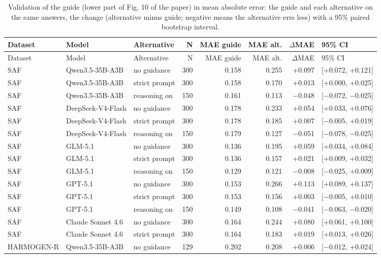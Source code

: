 \documentclass[10pt]{article}
\begin{document}
\begingroup\footnotesize
\begin{longtable}{lllrrrrl}
\caption{Validation of the guide (lower part of Fig. 10 of the paper) in mean absolute error: the guide and each alternative on the same answers, the change (alternative minus guide; negative means the alternative errs less) with a 95\% paired bootstrap interval.}\\
\hline
Dataset & Model & Alternative & N & MAE guide & MAE alt. & $\Delta$MAE & 95\% CI \\ \hline
\endfirsthead
\hline
Dataset & Model & Alternative & N & MAE guide & MAE alt. & $\Delta$MAE & 95\% CI \\ \hline
\endhead
SAF & Qwen3.5-35B-A3B & no guidance & 300 & 0.158 & 0.255 & +0.097 & [+0.072, +0.121] \\
SAF & Qwen3.5-35B-A3B & strict prompt & 300 & 0.158 & 0.170 & +0.013 & [+0.000, +0.025] \\
SAF & Qwen3.5-35B-A3B & reasoning on & 150 & 0.161 & 0.113 & $-$0.048 & [$-$0.072, $-$0.025] \\
SAF & DeepSeek-V4-Flash & no guidance & 300 & 0.178 & 0.233 & +0.054 & [+0.033, +0.076] \\
SAF & DeepSeek-V4-Flash & strict prompt & 300 & 0.178 & 0.185 & +0.007 & [$-$0.005, +0.019] \\
SAF & DeepSeek-V4-Flash & reasoning on & 150 & 0.179 & 0.127 & $-$0.051 & [$-$0.078, $-$0.025] \\
SAF & GLM-5.1 & no guidance & 300 & 0.136 & 0.195 & +0.059 & [+0.034, +0.084] \\
SAF & GLM-5.1 & strict prompt & 300 & 0.136 & 0.157 & +0.021 & [+0.009, +0.032] \\
SAF & GLM-5.1 & reasoning on & 150 & 0.129 & 0.121 & $-$0.008 & [$-$0.025, +0.009] \\
SAF & GPT-5.1 & no guidance & 300 & 0.153 & 0.266 & +0.113 & [+0.089, +0.137] \\
SAF & GPT-5.1 & strict prompt & 300 & 0.153 & 0.156 & +0.003 & [$-$0.005, +0.010] \\
SAF & GPT-5.1 & reasoning on & 150 & 0.149 & 0.108 & $-$0.041 & [$-$0.063, $-$0.020] \\
SAF & Claude Sonnet 4.6 & no guidance & 300 & 0.164 & 0.244 & +0.080 & [+0.061, +0.100] \\
SAF & Claude Sonnet 4.6 & strict prompt & 300 & 0.164 & 0.183 & +0.019 & [+0.013, +0.026] \\
HARMOGEN-R & Qwen3.5-35B-A3B & no guidance & 129 & 0.202 & 0.208 & +0.006 & [$-$0.012, +0.024] \\

\end{longtable}
\end{document}
